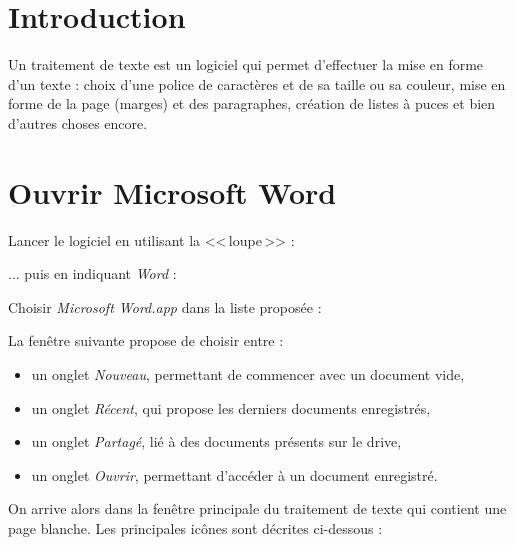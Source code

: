 \section{Introduction} 

Un traitement de texte est un logiciel qui permet d'effectuer la mise en forme d'un texte : choix d'une police de caractères et de sa taille ou sa couleur, mise en forme de la page (marges) et des paragraphes, création de listes à puces et bien d'autres choses encore.




\section{Ouvrir Microsoft Word}

Lancer le logiciel en utilisant la <<\,loupe\,>> :


... puis en indiquant \emph{Word} :


Choisir \emph{Microsoft Word.app} dans la liste proposée :


La fenêtre suivante propose de choisir entre :
\begin{itemize}
\item un onglet \emph{Nouveau}, permettant de commencer avec un document vide,
\item un onglet \emph{Récent}, qui propose les derniers documents enregistrés,
\item un onglet \emph{Partagé}, lié à des documents présents sur le drive,
\item un onglet \emph{Ouvrir}, permettant d'accéder à un document enregistré.
\end{itemize}


On arrive alors dans la fenêtre principale du traitement de texte qui contient une page blanche. Les principales icônes sont décrites ci-dessous :

